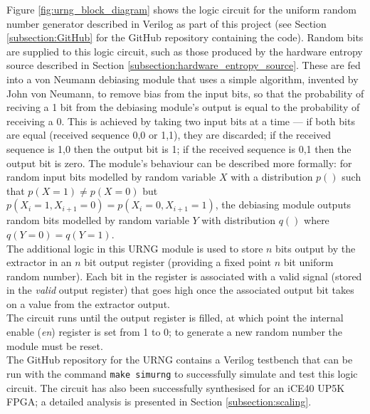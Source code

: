 \documentclass[12pt]{article}
\begin{document}
        Figure \ref{fig:urng_block_diagram} shows the logic circuit for the uniform random number generator described in Verilog as part of this project (see Section \ref{subsection:GitHub} for the GitHub repository containing the code). Random bits are supplied to this logic circuit, such as those produced by the hardware entropy source described in Section \ref{subsection:hardware_entropy_source}. These are fed into a von Neumann debiasing module that uses a simple algorithm, invented by John von Neumann, to remove bias from the input bits, so that the probability of reciving a 1 bit from the debiasing module's output is equal to the probability of receiving a 0. This is achieved by taking two input bits at a time --- if both bits are equal (received sequence 0,0 or 1,1), they are discarded; if the received sequence is 1,0 then the output bit is 1; if the received sequence is 0,1 then the output bit is zero. The module's behaviour can be described more formally: for random input bits modelled by random variable $X$ with a distribution $p()$ such that $p(X = 1) \neq p(X = 0)$ but $p(X_i = 1, X_{i+1} = 0) = p(X_i = 0,X_{i+1} = 1)$, the debiasing module outputs random bits modelled by random variable $Y$ with distribution $q()$ where $q(Y=0) = q(Y=1)$.\\

        The additional logic in this URNG module is used to store $n$ bits output by the extractor in an $n$ bit output register (providing a fixed point $n$ bit uniform random number). Each bit in the register is associated with a valid signal (stored in the \textit{valid} output register) that goes high once the associated output bit takes on a value from the extractor output.\\

        The circuit runs until the output register is filled, at which point the internal enable (\textit{en}) register is set from 1 to 0; to generate a new random number the module must be reset.\\

        The GitHub repository for the URNG contains a Verilog testbench that can be run with the command \texttt{make simurng} to successfully simulate and test this logic circuit. The circuit has also been successfully synthesised for an iCE40 UP5K FPGA; a detailed analysis is presented in Section \ref{subsection:scaling}.
\end{document}
